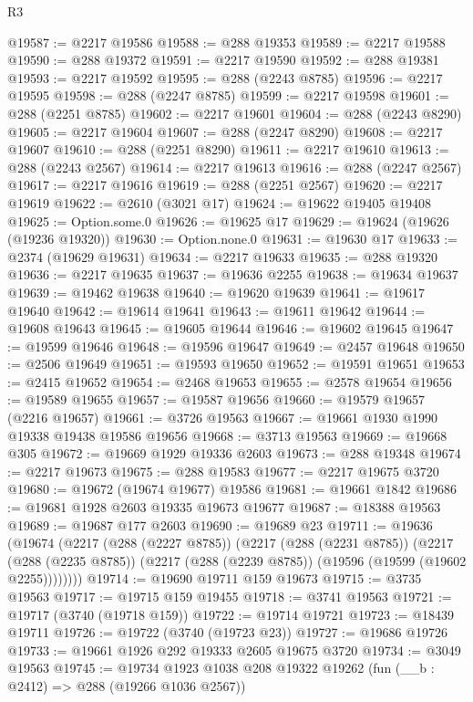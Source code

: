 \begin{lexlean}{R3}
\begin{coremodule}
@19587 := @2217 @19586
@19588 := @288 @19353
@19589 := @2217 @19588
@19590 := @288 @19372
@19591 := @2217 @19590
@19592 := @288 @19381
@19593 := @2217 @19592
@19595 := @288 (@2243 @8785)
@19596 := @2217 @19595
@19598 := @288 (@2247 @8785)
@19599 := @2217 @19598
@19601 := @288 (@2251 @8785)
@19602 := @2217 @19601
@19604 := @288 (@2243 @8290)
@19605 := @2217 @19604
@19607 := @288 (@2247 @8290)
@19608 := @2217 @19607
@19610 := @288 (@2251 @8290)
@19611 := @2217 @19610
@19613 := @288 (@2243 @2567)
@19614 := @2217 @19613
@19616 := @288 (@2247 @2567)
@19617 := @2217 @19616
@19619 := @288 (@2251 @2567)
@19620 := @2217 @19619
@19622 := @2610 (@3021 @17)
@19624 := @19622 @19405 @19408
@19625 := Option.some.{0}
@19626 := @19625 @17
@19629 := @19624 (@19626 (@19236 @19320))
@19630 := Option.none.{0}
@19631 := @19630 @17
@19633 := @2374 (@19629 @19631)
@19634 := @2217 @19633
@19635 := @288 @19320
@19636 := @2217 @19635
@19637 := @19636 @2255
@19638 := @19634 @19637
@19639 := @19462 @19638
@19640 := @19620 @19639
@19641 := @19617 @19640
@19642 := @19614 @19641
@19643 := @19611 @19642
@19644 := @19608 @19643
@19645 := @19605 @19644
@19646 := @19602 @19645
@19647 := @19599 @19646
@19648 := @19596 @19647
@19649 := @2457 @19648
@19650 := @2506 @19649
@19651 := @19593 @19650
@19652 := @19591 @19651
@19653 := @2415 @19652
@19654 := @2468 @19653
@19655 := @2578 @19654
@19656 := @19589 @19655
@19657 := @19587 @19656
@19660 := @19579 @19657 (@2216 @19657)
@19661 := @3726 @19563
@19667 := @19661 @1930 @1990 @19338 @19438 @19586 @19656
@19668 := @3713 @19563
@19669 := @19668 @305
@19672 := @19669 @1929 @19336 @2603
@19673 := @288 @19348
@19674 := @2217 @19673
@19675 := @288 @19583
@19677 := @2217 @19675 @3720
@19680 := @19672 (@19674 @19677) @19586
@19681 := @19661 @1842
@19686 := @19681 @1928 @2603 @19335 @19673 @19677
@19687 := @18388 @19563
@19689 := @19687 @177 @2603
@19690 := @19689 @23
@19711 := @19636
    (@19674
      (@2217
        (@288 (@2227 @8785))
        (@2217
          (@288 (@2231 @8785))
          (@2217
            (@288 (@2235 @8785))
            (@2217 (@288 (@2239 @8785)) (@19596 (@19599 (@19602 @2255))))))))
@19714 := @19690 @19711 @159 @19673
@19715 := @3735 @19563
@19717 := @19715 @159 @19455
@19718 := @3741 @19563
@19721 := @19717 (@3740 (@19718 @159))
@19722 := @19714 @19721
@19723 := @18439 @19711
@19726 := @19722 (@3740 (@19723 @23))
@19727 := @19686 @19726
@19733 := @19661 @1926 @292 @19333 @2605 @19675 @3720
@19734 := @3049 @19563
@19745 := @19734
    @1923
    @1038
    @208
    @19322
    @19262
    (fun (__b : @2412) => @288 (@19266 @1036 @2567))

\end{coremodule}
\end{lexlean}

